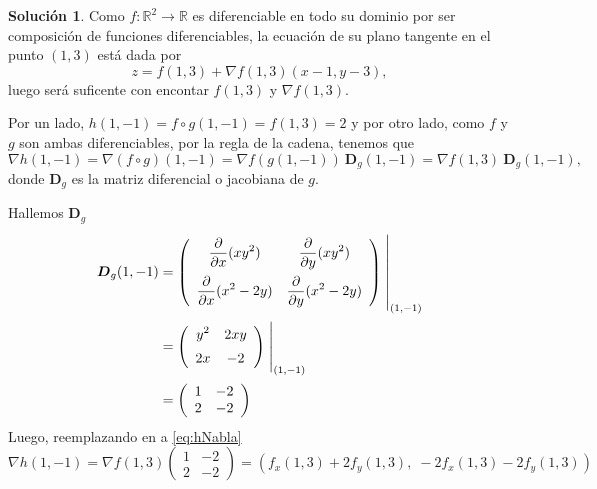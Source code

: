 \documentclass[10pt, a4paper]{report}
\renewcommand{\Re}{\mathbb {R}}
\newcommand{\partialx}{\frac{\partial}{\partial x}}
\newcommand{\partialy}{\frac{\partial}{\partial y}}
\theoremstyle{definition} %
\newtheorem{solution}{Solución}
\begin{document}
\newpage
\begin{solution}

    Como   $f:\Re^2\to\Re$ es diferenciable en todo su dominio por ser composición de funciones diferenciables,  la ecuaci\'on de su plano tangente en el punto $(1,3)$ est\'a dada por
    \begin{equation}
        z= f(1,3) + \nabla f(1,3) (x-1,y-3),  \label{eq:zNabla}
    \end{equation}   luego ser\'a  suficente con encontar $ f(1,3)$ y $\nabla f(1,3).$

    Por un lado,      $h(1,-1)= f\circ g (1,-1) =  f(1,3)=2$  y por otro lado,  como $f$ y $g$ son ambas diferenciables,  por la regla de la cadena,  tenemos que
    \begin{equation}
        \nabla h(1,-1)=\nabla (f\circ g)(1,-1)=\nabla f(g(1,-1)) \:\boldsymbol{D}_g(1,-1) = \nabla f (1,3) \:\boldsymbol{D}_g(1,-1),  \label{eq:hNabla}
    \end{equation}    donde $\boldsymbol{D}_g$ es la matriz diferencial o  jacobiana de $g$.

    \noindent  Hallemos $\boldsymbol{D}_g$
    \begin{align*}
        \boldsymbol{D}_g(1,-1) & =
        \left(\begin{array}{cc}
                      \displaystyle\partialx (xy^2)            & \displaystyle\partialy (xy^2)           \\[10pt]
                      \displaystyle\partialx  (x^2 -2y) & \displaystyle\partialy (x^2 -2y)
                  \end{array}\right)\left.\rule{0pt}{1.1cm}\right\rvert_{(1,-1)}             \\[2pt]
                              & =\left(\begin{array}{cc}
                                               \displaystyle y^2                 & \displaystyle 2xy              \\[5pt]
                                               \displaystyle   2x & \displaystyle -2
                                           \end{array}\right)\left.\rule{0pt}{0.7cm}\right\rvert_{(1,-1)} \\[2pt]
                              & =\left(\begin{array}{cc}
                                               1    & -2    \\
                                               2 & -2
                                           \end{array}\right)
    \end{align*}
    Luego, reemplazando en  a   \eqref{eq:hNabla}
    \[
        \nabla h(1,-1) = \nabla f(1,3)\left(\begin{array}{cc}
                1   & -2    \\
                2 & -2
            \end{array}\right) = \left(f_x(1,3) + 2f_y(1,3),\;-2f_x(1,3)-2f_y(1,3)\right)
    \]


\end{solution}
\end{document}
